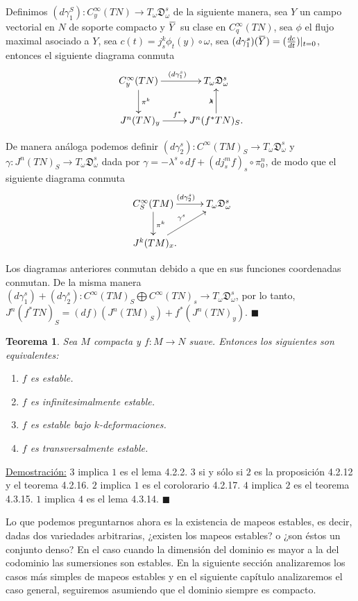 \documentclass{report}
\newtheorem{theorem}{Teorema}[section]
\theoremstyle{definition}
\newcommand{\overbar}[1]{\mkern 1.5mu\overline{\mkern-1.5mu#1\mkern-1.5mu}\mkern 1.5mu}
\begin{document}
Definimos $(d \gamma_1^S) : C^\infty_y (TN) \to T_\omega \mathfrak{D}_\omega^s$ de la siguiente manera, sea $Y$ un campo vectorial en $N$ de soporte compacto y $\overbar{Y}$ su clase en $C^\infty_q (TN)$, sea $\phi$ el flujo maximal asociado a $Y$, sea $c(t) = j^k_s \phi_t (y) \circ \omega$, sea $(d \gamma_1^s) (\overbar{Y}) = (\frac{dc}{dt}) \vert_{t=0}$, entonces el siguiente diagrama conmuta$$
\xymatrix{
C^\infty_y (TN) \ar[d]^{\pi^k} \ar[r]^{(d\gamma_1^s)}&T_\omega \mathfrak{D}_\omega^s \\\
J^n (TN)_y \ar[r]^{f^\ast} & \ar[u]^\lambda^s  J^n(f^\ast TN)_S .} $$

De manera an\'aloga podemos definir $(d \gamma_2^s): C^\infty (TM)_S \to T_\omega \mathfrak{D}_\omega^s$ y $\gamma: J^n (TN)_S \to T_\omega \mathfrak{D}_\omega^s$ dada por $\gamma= - \lambda^s \circ df + (d j^m_s f)_s \circ \pi^n_0$, de modo que el siguiente diagrama conmuta$$
\xymatrix{
C^\infty_S (TM) \ar[r]^{(d\gamma_2^s)} \ar[d]^{\pi^k} & T_\omega \mathfrak{D}_\omega^s\\\
 \ar[ur]^{\gamma^s} J^k (TM)_x .}$$ 
 
Los diagramas anteriores conmutan debido a que en sus funciones coordenadas conmutan. De la misma manera $(d \gamma^s_1) + (d \gamma^s_2): C^\infty (TM)_S \bigoplus C^\infty (TN)_s \to T_\omega \mathfrak{D}_\omega^s$, por lo tanto, $J^n (f^\ast TN)_S = (df)(J^n (TM)_S) + f^\ast (J^n (TN)_y)$. $\blacksquare$

\begin{theorem}
Sea $M$ compacta y $f:M \to N$ suave. Entonces los siguientes son equivalentes:
\begin{enumerate}
\item $f$ es estable.
\item $f$ es infinitesimalmente estable.
\item $f$ es estable bajo $k$-deformaciones.
\item $f$ es transversalmente estable.
\end{enumerate}



\end{theorem}
\underline{Demostraci\'on:} $3$ implica $1$ es el lema 4.2.2. $3$ si y s\'olo si $2$ es la proposici\'on 4.2.12 y el teorema 4.2.16. $2$ implica $1$ es el corolorario 4.2.17. $4$ implica $2$ es el teorema 4.3.15. $1$ implica $4$ es el lema 4.3.14. $\blacksquare$

Lo que podemos preguntarnos ahora es la existencia de mapeos estables, es decir, dadas dos variedades arbitrarias, ¿existen los mapeos estables? o ¿son \'estos un conjunto denso? En el caso cuando la dimensi\'on del dominio es mayor a la del codominio las sumersiones son estables. En la siguiente secci\'on analizaremos los casos m\'as simples de mapeos estables y en el siguiente cap\'itulo analizaremos el caso general, seguiremos asumiendo que el dominio siempre es compacto.
\end{document}
